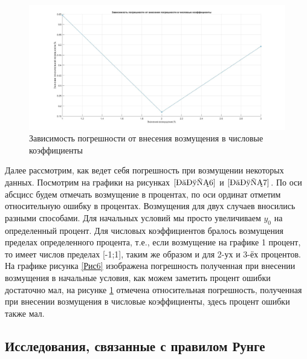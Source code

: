 \documentclass[a4paper]{article}
\begin{document}
\begin{figure}[h!]
\begin{center}
\includegraphics[scale=0.3]{возмущение в числовые коэффициенты.jpg} 
\end{center}
\caption{Зависимость погрешности от внесения возмущения в числовые коэффициенты} \label{Рис7}
\end{figure}
Далее рассмотрим, как ведет себя погрешность при возмущении некоторых данных. Посмотрим на графики на рисунках $\ref{Рис6}$ и $\ref{Рис7}  $. По оси абсцисс будем отмечать возмущение в процентах, по оси ординат отметим относительную ошибку в процентах. Возмущения для двух случаев вносились разными способами. Для начальных условий мы просто увеличиваем $y_0$ на определенный процент. Для числовых коэффициентов бралось возмущения пределах определенного процента, т.е., если возмущение на графике 1 процент, то имеет числов пределах [-1;1], таким же образом и для 2-ух и 3-ёх процентов. На графике рисунка \ref{Рис6} изображена погрешность полученная при внесении возмущения в начальные условия, как можем заметить процент ошибки достаточно мал, на рисунке \ref{Рис7} отмечена относительная погрешность, полученная при внесении возмущения в числовые коэффициенты, здесь процент ошибки также мал.

\subsection{Исследования, связанные с правилом Рунге} 
\end{document}
